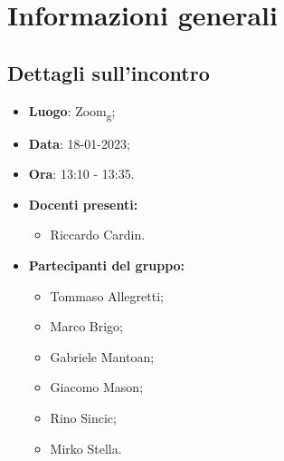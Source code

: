\section{Informazioni generali}

\subsection{Dettagli sull'incontro}
\begin{itemize}
    \item \textbf{Luogo}: Zoom\textsubscript{g};
    \item \textbf{Data}: 18-01-2023;
    \item \textbf{Ora}: 13:10 - 13:35.
    \item \textbf{Docenti presenti:}
        \begin{itemize}
            \item Riccardo Cardin.
        \end{itemize}
    \item \textbf{Partecipanti del gruppo:}
        \begin{itemize}
            \item Tommaso Allegretti;
            \item Marco Brigo;
            \item Gabriele Mantoan;
            \item Giacomo Mason;
            \item Rino Sincic;
            \item Mirko Stella.
        \end{itemize}
\end{itemize}

